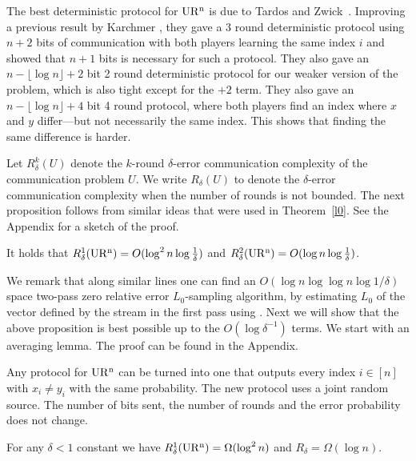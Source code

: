 The best deterministic protocol for $\operatorname{UR^n}$ is due to 
 Tardos and Zwick~\cite{TardosZwick}. Improving a previous result 
 by Karchmer \cite{Karchmer}, they gave a 3 round deterministic protocol 
 using $n+2$ bits of communication with both players learning the same index
 $i$ and showed that $n+1$ bits is necessary for such a protocol. They also
 gave an $n-\lfloor\log n\rfloor+2$ bit 2 round deterministic protocol for our
 weaker version of the problem, which is also tight except for the $+2$
 term. They also gave an $n-\lfloor\log n\rfloor+4$ bit 4 round protocol, where
 both players find an index where $x$ and $y$ differ---but not necessarily
 the same index. This shows that finding the same difference is harder.

Let $R^k_\delta(U)$ denote the $k$-round $\delta$-error communication
complexity of the communication problem $U$. We write $R_\delta(U)$ to denote
the $\delta$-error communication complexity when the number of rounds is not
bounded. The next proposition follows from similar ideas that were used in 
Theorem~\ref{l0}. See the Appendix for a sketch of the proof.

\begin{proposition}\label{thm:urub}
It holds that $R^1_\delta(\operatorname{UR^n})=O(\log^2 n\log\frac{1}{\delta})$ and $R^2_\delta(\operatorname{UR^n})=O(\log n\log\frac{1}{\delta})$.
\end{proposition}

We remark that along similar lines one can find an $O(\log n \log\log n\log1/\delta )$
space two-pass zero relative error $L_0$-sampling algorithm, by estimating  $L_0$ 
of the vector defined by the stream in the first pass using \cite{KaneNW10}. Next
 we will show that the above proposition is best possible up to the $O(\log\delta^{-1})$
terms. We start with an averaging lemma. The proof can be found in the Appendix.


\begin{lemma}\label{aver} Any protocol for $\operatorname{UR^n}$ can be turned into one that
outputs every index $i\in[n]$ with $x_i\ne y_i$ with the same probability. The
new protocol uses a joint random source. The number of bits sent, the number
of rounds and the error probability does not change.
\end{lemma}


\begin{theorem}\label{thm:urlb}
For any $\delta<1$ constant we have $R^1_\delta(\operatorname{UR^n})=\Omega(\log^2 n)$ and
$R_\delta=\Omega(\log n)$.
\end{theorem}

